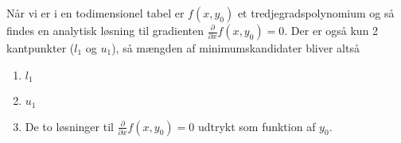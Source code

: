 \documentclass[a4paper, 12pt]{memoir}
\begin{document}
Når vi er i en todimensionel tabel er $f(x,y_0)$ et tredjegradspolynomium og så findes en analytisk løsning til gradienten $\frac{\partial}{\partial x}f(x,y_0)=0$. Der er også kun 2 kantpunkter ($l_1$ og $u_1$), så mængden af minimumskandidater bliver altså 
\begin{enumerate}
\item
$l_1$
\item
$u_1$
\item
De to løsninger til $\frac{\partial}{\partial x}f(x,y_0)=0$ udtrykt som funktion af $y_0$.
\end{enumerate}
\end{document}
